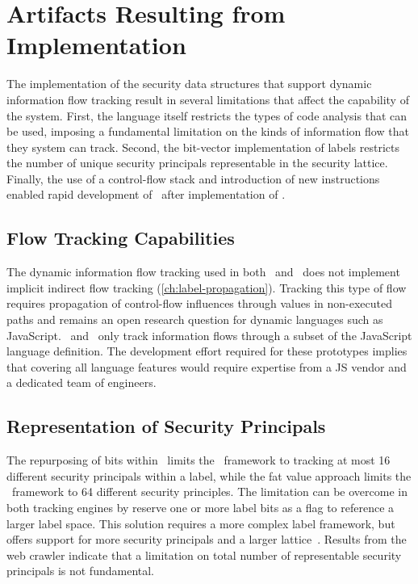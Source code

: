 \section{Artifacts Resulting from Implementation}

The implementation of the security data structures that support dynamic information flow tracking result in several limitations that affect the capability of the system.
First, the language itself restricts the types of code analysis that can be used, imposing a fundamental limitation on the kinds of information flow that they system can track.
Second, the bit-vector implementation of labels restricts the number of unique security principals representable in the security lattice.
Finally, the use of a control-flow stack and introduction of new instructions enabled rapid development of \JitFlow\ after implementation of \FlowCore.

\subsection{Flow Tracking Capabilities}

The dynamic information flow tracking used in both \FlowCore\ and \JitFlow\ does not implement implicit indirect flow tracking (\autoref{ch:label-propagation}).
Tracking this type of flow requires propagation of control-flow influences through values in non-executed paths and remains an open research question for dynamic languages such as JavaScript.
\FlowCore\ and \JitFlow\ only track information flows through a subset of the JavaScript language definition.
The development effort required for these prototypes implies that covering all language features would require expertise from a JS vendor and a dedicated team of engineers.

\subsection{Representation of Security Principals}

The repurposing of bits within \jsvalues\ limits the \JitFlow\ framework to tracking at most 16 different security principals within a label, while the fat value approach limits the \FlowCore\ framework to 64 different security principles.
The limitation can be overcome in both tracking engines by reserve one or more label bits as a flag to reference a larger label space.
This solution requires a more complex label framework, but offers support for more security principals and a larger lattice~\cite{kerschbaumer.etal+13}.
Results from the web crawler indicate that a limitation on total number of representable security principals is not fundamental.


